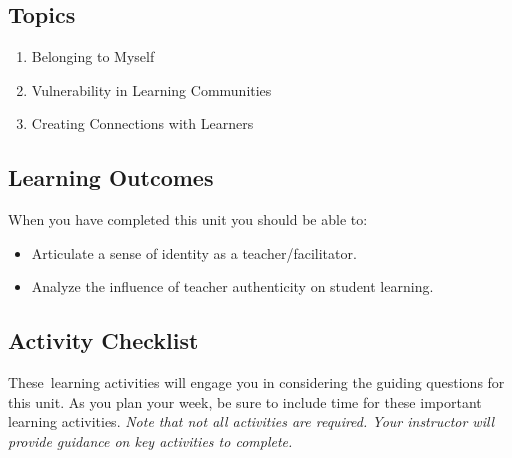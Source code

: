 \documentclass[
]{book}
\providecommand{\tightlist}{%
  \setlength{\itemsep}{0pt}\setlength{\parskip}{0pt}}
\begin{document}
\hypertarget{topics-1}{%
\subsection*{Topics}\label{topics-1}}

\begin{enumerate}
\def\labelenumi{\arabic{enumi}.}
\tightlist
\item
  Belonging to Myself\\
\item
  Vulnerability in Learning Communities\\
\item
  Creating Connections with Learners
\end{enumerate}

\hypertarget{learning-outcomes-1}{%
\subsection*{Learning Outcomes}\label{learning-outcomes-1}}

When you have completed this unit you should be able to:

\begin{itemize}
\tightlist
\item
  Articulate a sense of identity as a teacher/facilitator.\\
\item
  Analyze the influence of teacher authenticity on student learning.
\end{itemize}

\hypertarget{activity-checklist-1}{%
\subsection*{Activity Checklist}\label{activity-checklist-1}}

These~learning activities will engage you in considering the guiding questions for this unit. As you plan your week, be sure to include time for these important learning activities. \emph{Note that not all activities are required. Your instructor will provide guidance on key activities to complete.}
\end{document}
